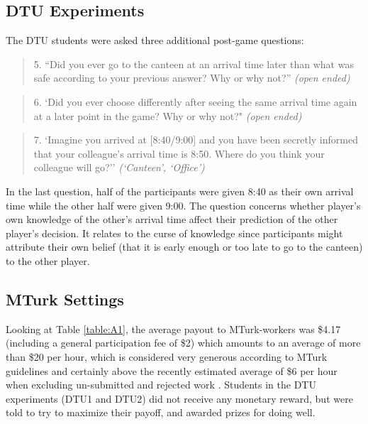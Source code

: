 \subsection{DTU Experiments}\label{app:dtu-experiments}
The DTU students were asked three additional post-game questions:
\begin{quote}
5. ``Did you ever go to the canteen at an arrival time later than what was safe according
to your previous answer? Why or why not?'' \textit{(open ended)}
\end{quote}
\begin{quote}
6. `Did you ever choose differently after seeing the same arrival time again at a later point
in the game? Why or why not?" \textit{(open ended)}
\end{quote}
\begin{quote}
7. `Imagine you arrived at [8:40/9:00] and you have been secretly informed that your colleague’s arrival time is 8:50. Where do you think your colleague will go?'' \textit{(`Canteen', `Office')}
\end{quote}
In the last question, half of the participants were given 8:40 as their own arrival time while the other half were given 9:00. The question concerns whether player’s own knowledge of the other’s arrival time affect their prediction of the other player’s decision. It relates to the curse of knowledge \cite{birch2007curse} since participants might attribute their own belief (that it is early enough or too late to go to the canteen) to the other player.

\subsection{MTurk Settings}
\label{MTurksettings}
Looking at Table \ref{table:A1}, the average payout to MTurk-workers was \$4.17 (including a general participation fee of \$2) which amounts to an average of more than \$20 per hour, which is considered very generous according to MTurk guidelines and certainly above the recently estimated average of \$6 per hour when excluding un-submitted and rejected work \cite{HaraEtAl18}. Students in the DTU experiments (DTU1 and DTU2) did not receive any monetary reward, but were told to try to maximize their payoff, and awarded prizes for doing well.

